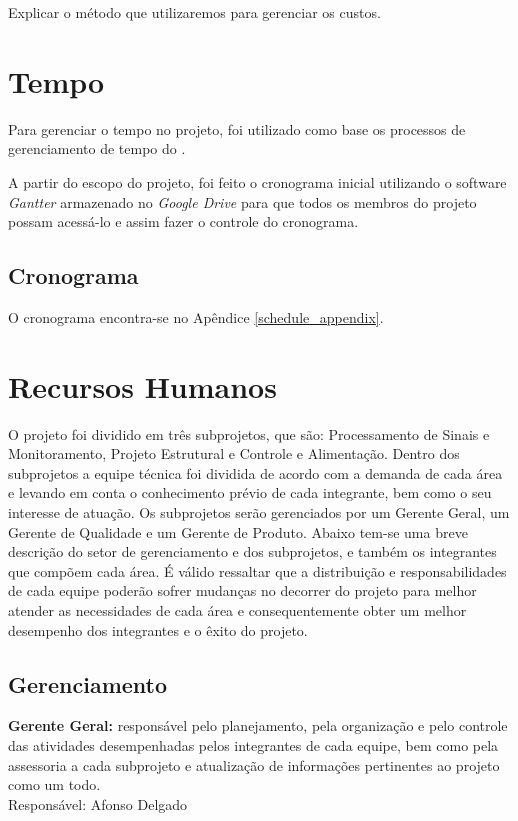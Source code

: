Explicar o método que utilizaremos para gerenciar os custos.

\section{Tempo}

Para gerenciar o tempo no projeto, foi utilizado como base os processos
de gerenciamento de tempo do \cite{pmbok2012}.

A partir do escopo do projeto, foi feito o cronograma inicial utilizando o software \textit{Gantter} armazenado no \textit{Google Drive} para que todos os membros do projeto
possam acessá-lo e assim fazer o controle do cronograma.

\subsection{Cronograma}

O cronograma encontra-se no Apêndice \ref{schedule_appendix}.

\section{Recursos Humanos}

O projeto foi dividido em três subprojetos, que são: Processamento de Sinais e Monitoramento,
Projeto Estrutural e Controle e Alimentação. Dentro dos subprojetos a equipe
técnica foi dividida de acordo com a demanda de cada área e levando em conta o
conhecimento prévio de cada integrante, bem como o seu interesse de atuação. Os
subprojetos serão gerenciados por um Gerente Geral, um Gerente de Qualidade e
um Gerente de Produto.
Abaixo tem-se uma breve descrição do setor de gerenciamento e dos subprojetos,
e também os integrantes que compõem cada área. É válido ressaltar que a
distribuição e responsabilidades de cada equipe poderão sofrer mudanças no
decorrer do projeto para melhor atender as necessidades de cada área e
consequentemente obter um melhor desempenho dos integrantes e o êxito do projeto.

\subsection{Gerenciamento}

\textbf{Gerente Geral:} responsável pelo planejamento, pela organização e pelo controle das atividades desempenhadas pelos integrantes de cada equipe, bem como pela assessoria a cada subprojeto e atualização de informações pertinentes ao projeto como um todo.
\\Responsável: Afonso Delgado

